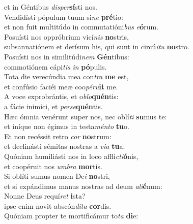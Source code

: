 \oddverse et in Géntibus \textit{di}\textit{sper}\textbf{sí}sti nos.\\
\evenverse Vendidísti pópulum tuum si\textit{ne} \textbf{pré}tio:~\*\\
\evenverse et non fuit multitúdo in commutatióni\textit{bus} \textit{e}\textbf{ó}rum.\\
\oddverse Posuísti nos oppróbrium vicí\textit{nis} \textbf{no}stris,~\*\\
\oddverse subsannatiónem et derísum his, qui sunt in circú\textit{i}\textit{tu} \textbf{no}stro.\\
\evenverse Posuísti nos in similitúdi\textit{nem} \textbf{Gén}tibus:~\*\\
\evenverse commotiónem cápi\textit{tis} \textit{in} \textbf{pó}pulis.\\
\oddverse Tota die verecúndia mea con\textit{tra} \textbf{me} est,~\*\\
\oddverse et confúsio faciéi meæ coo\textit{pé}\textit{ru}\textbf{it} me.\\
\evenverse A voce exprobrántis, et o\textit{blo}\textbf{quén}tis:~\*\\
\evenverse a fácie inimíci, et \textit{per}\textit{se}\textbf{quén}tis.\\
\oddverse Hæc ómnia venérunt super nos, nec oblí\textit{ti} \textbf{su}mus te:~\*\\
\oddverse et iníque non égimus in testa\textit{mén}\textit{to} \textbf{tu}o.\\
\evenverse Et non recéssit retro \textit{cor} \textbf{no}strum:~\*\\
\evenverse et declinásti sémitas nostras a \textit{vi}\textit{a} \textbf{tu}a:\\
\oddverse Quóniam humiliásti nos in loco affli\textit{cti}\textbf{ó}nis,~\*\\
\oddverse et coopéruit nos \textit{um}\textit{bra} \textbf{mor}tis.\\
\evenverse Si oblíti sumus nomen De\textit{i} \textbf{no}stri,~\*\\
\evenverse et si expándimus manus nostras ad deum \textit{a}\textit{li}\textbf{é}num:\\
\oddverse Nonne Deus requí\textit{ret} \textbf{i}sta?~\*\\
\oddverse ipse enim novit abscón\textit{di}\textit{ta} \textbf{cor}dis.\\
\evenverse Quóniam propter te mortificámur to\textit{ta} \textbf{di}e:~\*\\
